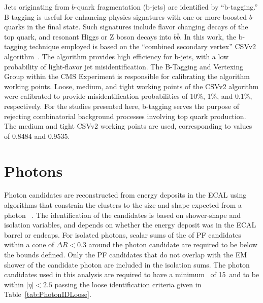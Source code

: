 Jets originating from $b$-quark fragmentation (b-jets) are identified by ``b-tagging.''
B-tagging is useful for enhancing physics signatures with one or more boosted $b$-quarks in the final state.
Such signatures include flavor changing decays of the top quark, and 
resonant Higgs or Z boson decays into $b\bar{b}$.
In this work, the b-tagging technique employed is based on the ``combined secondary vertex'' CSVv2 algorithm~\cite{Sirunyan:2017ezt}.
The algorithm provides high efficiency for b-jets, with a low probability of light-flavor jet misidentification.
The B-Tagging and Vertexing Group within the CMS Experiment is responsible for calibrating the algorithm working points.
Loose, medium, and tight working points of the CSVv2 algorithm were calibrated to provide misidentification probabilities of 10\%, 1\%, and 0.1\%, respectively.
For the studies presented here, b-tagging serves the purpose of rejecting combinatorial
background processes involving top quark production.
The medium and tight CSVv2 working points are used, corresponding to values of 0.8484 and 0.9535.


\section{Photons}
Photon candidates are reconstructed from energy deposits in the ECAL using algorithms
that constrain the clusters to the size and shape expected from a photon~\cite{CMS:EGM-14-001} .
The identification of the candidates is based on shower-shape and isolation variables, and depends on
whether the energy deposit was in the ECAL barrel or endcaps.
For isolated photons, scalar sums of the \pt of PF candidates within a cone of $\Delta R < 0.3$
around the photon candidate are required to be below the bounds defined. Only the PF candidates
that do not overlap with the EM shower of the candidate photon are included in the isolation sums.
The photon candidates used in this analysis are required to have a minimum \pt~of 15~\GeV and to  
be within $|\eta| < 2.5$ passing the loose identification criteria given in Table~\ref{tab:PhotonIDLoose}.

